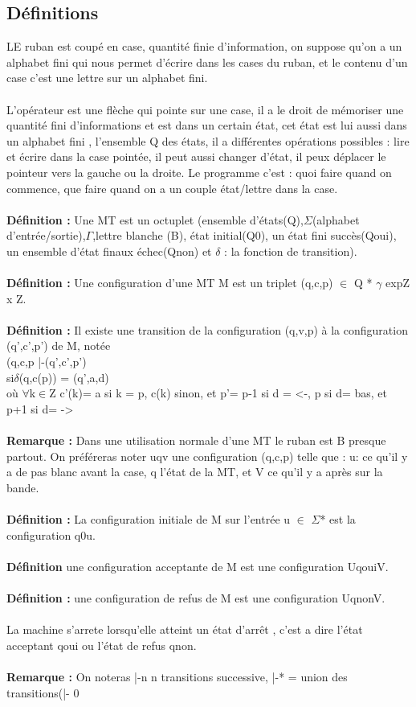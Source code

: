 \documentclass{article}
\begin{document}
\subsection{Définitions} LE ruban est coupé en case, quantité finie d'information, on suppose qu'on a un alphabet fini qui nous permet d'écrire dans les cases du ruban, et le contenu d'un case c'est une lettre sur un alphabet fini.\\\\L’opérateur est une flèche qui pointe sur une case, il a le droit de mémoriser une quantité fini d'informations et est dans un certain état, cet état est lui aussi dans un alphabet fini , l'ensemble Q des états, il a différentes opérations possibles : lire et écrire dans la case pointée, il peut aussi changer d'état, il peux déplacer le pointeur vers la gauche ou la droite. Le programme c'est  : quoi faire quand on commence, que faire quand on a un couple état/lettre dans la case.\\\\\textbf{Définition : }Une MT est un octuplet (ensemble d'états(Q),$\Sigma$(alphabet d'entrée/sortie),$\Gamma$,lettre blanche (B), état initial(Q0), un état fini succès(Qoui), un ensemble d'état finaux échec(Qnon) et $\delta$ : la fonction de transition).\\\\\textbf{Définition : } Une configuration d'une MT M est un triplet (q,c,p) $\in$ Q * $\gamma$ exp{Z} x Z.\\\\\textbf{Définition : } Il existe une transition de la configuration (q,v,p) à la configuration (q',c',p') de M, notée \\(q,c,p |-(q',c',p')\\si$\delta$(q,c(p)) = (q',a,d)\\où $\forall$k$\in$Z c'(k)= a si k = p, c(k) sinon, et p'=  p-1 si d = <-, p si d= bas, et p+1 si d= ->\\\\\textbf{Remarque : }Dans une utilisation normale d'une MT le ruban est B presque partout. On préféreras noter uqv une configuration (q,c,p) telle que : u: ce qu'il y a de pas blanc avant la case, q l'état de la MT, et V ce qu'il y a après sur la bande.\\\\\textbf{Définition : } La configuration initiale de M sur l'entrée u $\in$ $\Sigma$* est la configuration q0u.\\\\\textbf{Définition} une configuration acceptante de M est une configuration UqouiV.\\\\\textbf{Définition : }une configuration de refus de M est une configuration UqnonV.\\\\La machine s'arrete lorsqu'elle atteint un état d’arrêt , c’est a dire l'état acceptant qoui ou l'état de refus qnon.\\\\\textbf{Remarque : }On noteras |-n n transitions successive, |-* = union des transitions(|- 0 
\end{document}
